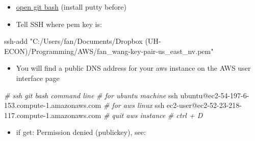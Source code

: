 \documentclass[
]{book}
\newenvironment{Shaded}{\begin{snugshade}}{\end{snugshade}}
\newcommand{\BuiltInTok}[1]{#1}
\newcommand{\CommentTok}[1]{\textcolor[rgb]{0.56,0.35,0.01}{\textit{#1}}}
\newcommand{\FunctionTok}[1]{\textcolor[rgb]{0.00,0.00,0.00}{#1}}
\newcommand{\NormalTok}[1]{#1}
\newcommand{\StringTok}[1]{\textcolor[rgb]{0.31,0.60,0.02}{#1}}
\newcommand{\VariableTok}[1]{\textcolor[rgb]{0.00,0.00,0.00}{#1}}
\providecommand{\tightlist}{%
  \setlength{\itemsep}{0pt}\setlength{\parskip}{0pt}}
\begin{document}
\begin{enumerate}
  \begin{itemize}
  \tightlist
  \item
    \href{https://stackoverflow.com/questions/18683092/how-to-run-ssh-add-on-windows}{open git bash} (install putty before)
  \end{itemize}

\begin{Shaded}
\end{Shaded}

  \begin{itemize}
  \tightlist
  \item
    Tell SSH where pem key is:
  \end{itemize}

\begin{Shaded}
\begin{Highlighting}[]
\FunctionTok{ssh{-}add} \StringTok{"C:/Users/fan/Documents/Dropbox (UH{-}ECON)/Programming/AWS/fan\_wang{-}key{-}pair{-}us\_east\_nv.pem"}
\end{Highlighting}
\end{Shaded}

  \begin{itemize}
  \tightlist
  \item
    You will find a public DNS address for your aws instance on the AWS user interface page
  \end{itemize}

\begin{Shaded}
\begin{Highlighting}[]
\CommentTok{\# ssh git bash command line}
\CommentTok{\# for ubuntu machine}
\FunctionTok{ssh}\NormalTok{ ubuntu@ec2{-}54{-}197{-}6{-}153.compute{-}1.amazonaws.com}
\CommentTok{\# for aws linux}
\FunctionTok{ssh}\NormalTok{ ec2{-}user@ec2{-}52{-}23{-}218{-}117.compute{-}1.amazonaws.com}
\CommentTok{\# quit aws instance}
\CommentTok{\# ctrl + D}
\end{Highlighting}
\end{Shaded}

  \begin{itemize}
  \tightlist
  \item
    if get: Permission denied (publickey), see:


\end{itemize}
\end{enumerate}
\end{document}
